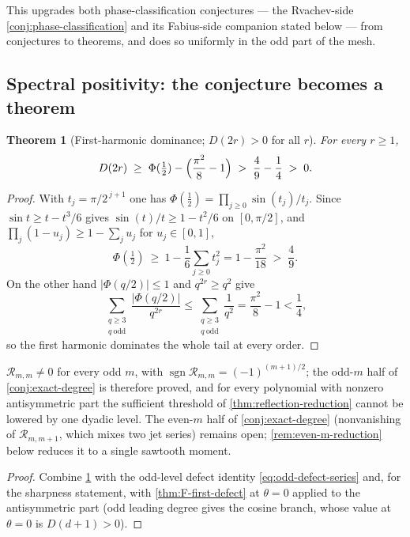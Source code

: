 \documentclass[11pt,oneside]{article}
\numberwithin{equation}{section}
\newtheorem{theorem}{Theorem}[section]
\theoremstyle{definition}
\theoremstyle{remark}
\newcommand{\abs}[1]{\left\lvert #1\right\rvert}
\newcommand{\sgn}{\operatorname{sgn}}
\newcommand{\defect}{\mathcal R}
\begin{document}
This upgrades both phase-classification conjectures --- the
Rvachev-side \cref{conj:phase-classification} and its Fabius-side
companion stated below --- from conjectures to theorems, and does so
uniformly in the odd part of the mesh.

\subsection{Spectral positivity: the conjecture becomes a theorem}

\begin{theorem}[First-harmonic dominance; $D(2r)>0$ for all $r$]
\label{thm:D-positive}
For every $r\ge1$,
\begin{equation}
 D(2r)\;\ge\;\Phi(\tfrac12)-\Bigl(\frac{\pi^{2}}8-1\Bigr)
 \;>\;\frac49-\frac14\;>\;0.
 \label{eq:D-positive}
\end{equation}
\end{theorem}

\begin{proof}
With $t_j=\pi/2^{\,j+1}$ one has
$\Phi(\tfrac12)=\prod_{j\ge0}\sin(t_j)/t_j$.  Since
$\sin t\ge t-t^{3}/6$ gives $\sin(t)/t\ge1-t^{2}/6$ on
$[0,\pi/2]$, and $\prod_j(1-u_j)\ge1-\sum_ju_j$ for
$u_j\in[0,1]$,
\[
 \Phi(\tfrac12)\ \ge\ 1-\frac16\sum_{j\ge0}t_j^{2}
 =1-\frac{\pi^{2}}{18}
 \;>\;\frac49.
\]
On the other hand $\abs{\Phi(q/2)}\le1$ and $q^{2r}\ge q^{2}$ give
\[
 \sum_{\substack{q\ge3\\q\ \mathrm{odd}}}
 \frac{\abs{\Phi(q/2)}}{q^{2r}}
 \le\sum_{\substack{q\ge3\\q\ \mathrm{odd}}}\frac1{q^{2}}
 =\frac{\pi^{2}}8-1<\frac14 ,
\]
so the first harmonic dominates the whole tail at every order.
\end{proof}

\begin{corollary}
\label{cor:odd-sharp}
$\defect_{m,m}\ne0$ for every odd $m$, with
$\sgn\defect_{m,m}=(-1)^{(m+1)/2}$; the odd-$m$ half of
\cref{conj:exact-degree} is therefore proved, and for every polynomial
with nonzero antisymmetric part the sufficient threshold of
\cref{thm:reflection-reduction} cannot be lowered by one dyadic level.
The even-$m$ half of \cref{conj:exact-degree} (nonvanishing of
$\defect_{m,m+1}$, which mixes two jet series) remains open;
\cref{rem:even-m-reduction} below reduces it to a single sawtooth
moment.
\end{corollary}

\begin{proof}
Combine \cref{thm:D-positive} with the odd-level defect identity
\eqref{eq:odd-defect-series} and, for the sharpness statement, with
\cref{thm:F-first-defect} at $\theta=0$ applied to the antisymmetric
part (odd leading degree gives the cosine branch, whose value at
$\theta=0$ is $D(d+1)>0$).
\end{proof}
\end{document}
